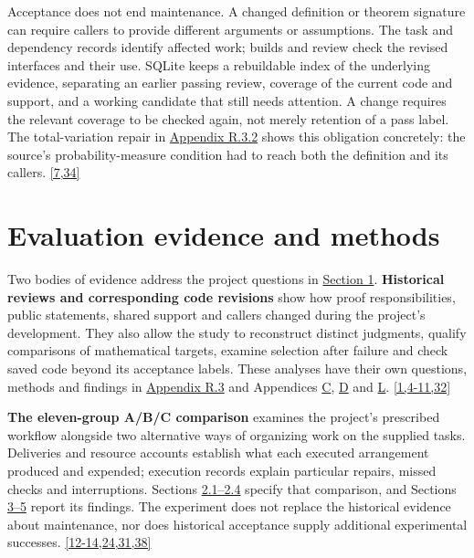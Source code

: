 Acceptance does not end maintenance. A changed definition or theorem signature can require callers to provide different arguments or assumptions. The task and dependency records identify affected work; builds and review check the revised interfaces and their use. SQLite keeps a rebuildable index of the underlying evidence, separating an earlier passing review, coverage of the current code and support, and a working candidate that still needs attention. A change requires the relevant coverage to be checked again, not merely retention of a pass label. The total-variation repair in \href{en-appendix.pdf\#r3-2}{Appendix R.3.2} shows this obligation concretely: the source's probability-measure condition had to reach both the definition and its callers. \hyperlink{ref-7}{\mbox{[7,34]}}

\section[Evaluation evidence and methods]{\texorpdfstring{\protect\hypertarget{section-2}{}Evaluation evidence and methods}{Evaluation evidence and methods}}
Two bodies of evidence address the project questions in \hyperlink{evaluation-questions}{Section 1}. \textbf{Historical reviews and corresponding code revisions} show how proof responsibilities, public statements, shared support and callers changed during the project's development. They also allow the study to reconstruct distinct judgments, qualify comparisons of mathematical targets, examine selection after failure and check saved code beyond its acceptance labels. These analyses have their own questions, methods and findings in \href{en-appendix.pdf\#r3}{Appendix R.3} and Appendices \href{en-appendix.pdf\#appendix-c}{C}, \href{en-appendix.pdf\#appendix-d}{D} and \href{en-appendix.pdf\#appendix-l}{L}. \hyperlink{ref-1}{\mbox{[1,4-11,32]}}

\textbf{The eleven-group A/B/C comparison} examines the project's prescribed workflow alongside two alternative ways of organizing work on the supplied tasks. Deliveries and resource accounts establish what each executed arrangement produced and expended; execution records explain particular repairs, missed checks and interruptions. Sections \hyperlink{section-2-1}{2.1–2.4} specify that comparison, and Sections \hyperlink{section-3}{3–5} report its findings. The experiment does not replace the historical evidence about maintenance, nor does historical acceptance supply additional experimental successes. \hyperlink{ref-12}{\mbox{[12-14,24,31,38]}}

